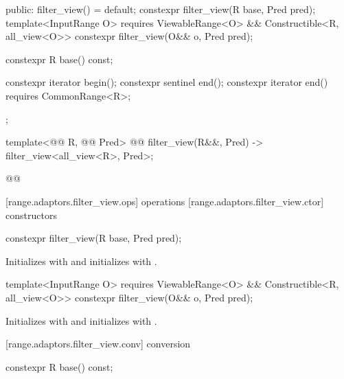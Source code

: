 {\begin{codeblock}
{{  public:
    filter_view() = default;
    constexpr filter_view(R base, Pred pred);
    template<InputRange O>
      requires ViewableRange<O> && Constructible<R, all_view<O>>
    constexpr filter_view(O&& o, Pred pred);

    constexpr R base() const;

    constexpr iterator begin();
    constexpr sentinel end();
    constexpr iterator end() requires CommonRange<R>;
  };

  template<@@ R, @@ Pred>
    @@
  filter_view(R&&, Pred) -> filter_view<all_view<R>, Pred>;
}@\oldtxt{\}}@
\end{codeblock}

[range.adaptors.filter_view.ops]{ operations}
[range.adaptors.filter_view.ctor]{ constructors}

%
\begin{itemdecl}
constexpr filter_view(R base, Pred pred);
\end{itemdecl}

\begin{itemdescr}
\pnum
\effects Initializes  with  and initializes
 with .
\end{itemdescr}

%
\begin{itemdecl}
template<InputRange O>
  requires ViewableRange<O> && Constructible<R, all_view<O>>
constexpr filter_view(O&& o, Pred pred);
\end{itemdecl}

\begin{itemdescr}
\pnum
\effects Initializes  with 
and initializes  with .
\end{itemdescr}

[range.adaptors.filter_view.conv]{ conversion}

%
\begin{itemdecl}
constexpr R base() const;
\end{itemdecl}

\begin{itemdescr}
\pnum
\oldtxt{\returns}  
\end{itemdescr}

}
